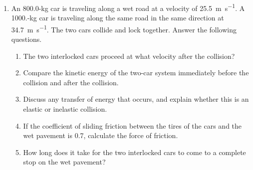 \documentclass{../../../oss-apphys}
\begin{document}
\begin{enumerate}[leftmargin=15pt]
  
\item An 800.0-kg car is traveling along a wet road at a velocity of
  \SI{25.5}{\metre\per\second}. A \num{1000.}-kg car is traveling along the
  same road in the same direction at \SI{34.7}{\metre\per\second}. The two cars
  collide and lock together. Answer the following questions.
  \begin{enumerate}[leftmargin=18pt]
  \item The two interlocked cars proceed at what velocity after the collision?
  \item Compare the kinetic energy of the two-car system immediately before
    the collision and after the collision.
  \item Discuss any transfer of energy that occurs, and explain whether this is
    an elastic or inelastic collision.
  \item If the coefficient of sliding friction between the tires of the cars
    and the wet pavement is 0.7, calculate the force of friction.
  \item  How long does it take for the two interlocked cars to come to a
    complete stop on the wet pavement?
  \end{enumerate}
  \newpage
  

\end{enumerate}
\end{document}
